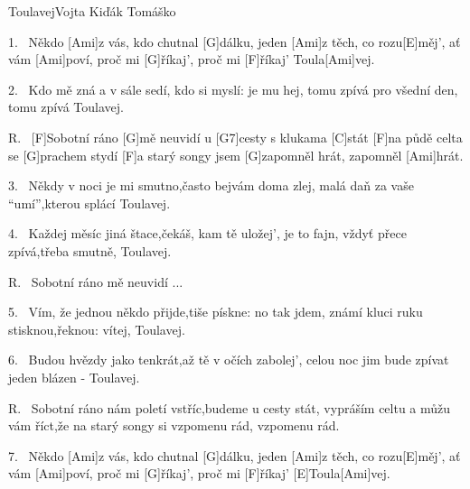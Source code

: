 \begin{song}{Toulavej}{Vojta Kiďák Tomáško}

\begin{xverse}{1.~}
Někdo [Ami]z vás, kdo chutnal [G]dálku, jeden [Ami]z těch, co rozu[E]měj',
ať vám [Ami]poví, proč mi [G]{ří}kaj', proč mi [F]{ří}kaj' Toula[Ami]vej.
\end{xverse}


\begin{xverse}{2.~}
Kdo mě zná a v sále sedí, kdo si myslí: je mu hej,
tomu zpívá pro všední den, tomu zpívá Toulavej.
\end{xverse}


\begin{xverse}{R.~}
[F]Sobotní ráno [G]mě neuvidí u [G7]cesty s klukama [C]stát
[F]na půdě celta se [G]prachem stydí [F]a starý songy jsem [G]zapomněl hrát,
zapomněl [Ami]hrát.
\end{xverse}


\begin{xverse}{3.~}
Někdy v noci je mi smutno,často bejvám doma zlej,
malá daň za vaše ``umí'',kterou splácí Toulavej.
\end{xverse}


\begin{xverse}{4.~}
Každej měsíc jiná štace,čekáš, kam tě uložej',
je to fajn, vždyť přece zpívá,třeba smutně, Toulavej.
\end{xverse}

\begin{xverse}{R.~}
Sobotní ráno mě neuvidí ...
\end{xverse}

\begin{xverse}{5.~}
Vím, že jednou někdo přijde,tiše pískne: no tak jdem,
známí kluci ruku stisknou,řeknou: vítej, Toulavej.
\end{xverse}


\begin{xverse}{6.~}
Budou hvězdy jako tenkrát,až tě v očích zabolej',
celou noc jim bude zpívat jeden blázen - Toulavej.
\end{xverse}


\begin{xverse}{R.~}
Sobotní ráno nám poletí vstříc,budeme u cesty stát,
vypráším celtu a můžu vám říct,že na starý songy si vzpomenu rád,
vzpomenu rád.
\end{xverse}

\begin{xverse}{7.~}
Někdo [Ami]z vás, kdo chutnal [G]dálku, jeden [Ami]z těch, co rozu[E]měj',
ať vám [Ami]poví, proč mi [G]{ří}kaj', proč mi [F]{ří}kaj' [E]Toula[Ami]vej.
\end{xverse}
\end{song}

